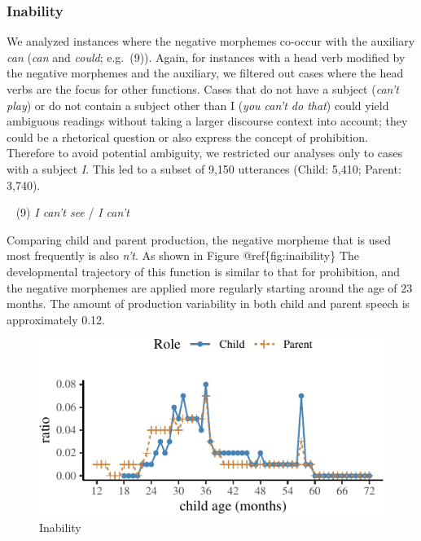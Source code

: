 \documentclass[10pt, letterpaper]{article}
\newenvironment{CodeChunk}{}{}
\begin{document}
\hypertarget{inability}{%
\subsubsection{Inability}\label{inability}}

We analyzed instances where the negative morphemes co-occur with the
auxiliary \emph{can} (\emph{can} and \emph{could}; e.g.~(9)). Again, for
instances with a head verb modified by the negative morphemes and the
auxiliary, we filtered out cases where the head verbs are the focus for
other functions. Cases that do not have a subject (\emph{can't play}) or
do not contain a subject other than I (\emph{you can't do that}) could
yield ambiguous readings without taking a larger discourse context into
account; they could be a rhetorical question or also express the concept
of prohibition. Therefore to avoid potential ambiguity, we restricted
our analyses only to cases with a subject \emph{I}. This led to a subset
of 9,150 utterances (Child: 5,410; Parent: 3,740).

~ (9) \emph{I can't see} / \emph{I can't}

Comparing child and parent production, the negative morpheme that is
used most frequently is also \emph{n't}. As shown in Figure
@ref\{fig:inaibility\} The developmental trajectory of this function is
similar to that for prohibition, and the negative morphemes are applied
more regularly starting around the age of 23 months. The amount of
production variability in both child and parent speech is approximately
0.12.

\begin{CodeChunk}
\begin{figure}[H]

{\centering \includegraphics{figs/inability-1} 

}

\caption[Inability]{Inability}\label{fig:inability}
\end{figure}
\end{CodeChunk}
\end{document}
